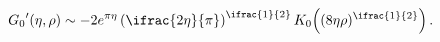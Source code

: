 \[\mathop{G_{0}\/}\nolimits'\!\left(\eta,\rho\right)\sim-2e^{\pi\eta}\left(%
\ifrac{2\eta}{\pi}\right)^{\ifrac{1}{2}}\mathop{K_{0}\/}\nolimits\!\left((8%
\eta\rho)^{\ifrac{1}{2}}\right).\]